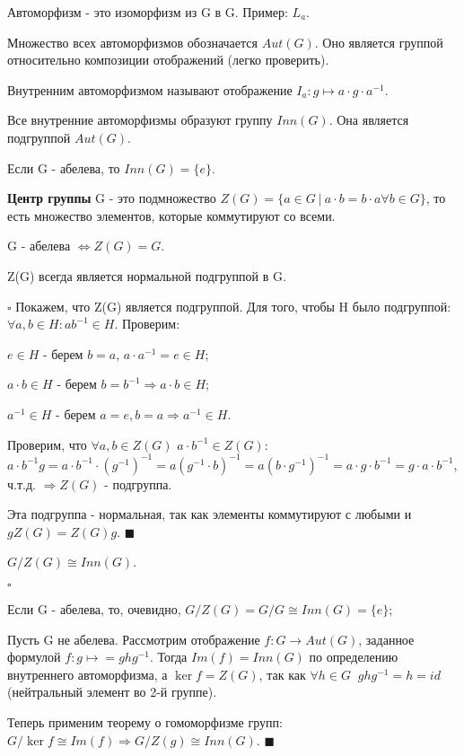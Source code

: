 \documentclass[../main.tex]{subfiles}
\begin{document}
\void{} Автоморфизм - это изоморфизм из G в G. Пример: $L_a$.

\void{} Множество всех автоморфизмов обозначается $Aut(G)$. 
Оно является группой относительно композиции отображений (легко проверить).

\void{} Внутренним автоморфизмом называют отображение $I_a: g\mapsto a\cdot g\cdot a^{-1}$.

\void{} Все внутренние автоморфизмы образуют группу
$Inn(G)$. Она является подгруппой $Aut(G)$.

\void{} Если G - абелева, то $Inn(G) = \{e\}$.

\void{} \textbf{Центр группы} G - это подмножество $Z(G) = \{a\in G\:\vert\: a\cdot b = b\cdot a \forall b\in G\}$, то
есть множество элементов, которые коммутируют со всеми.

\void{} G - абелева $\Longleftrightarrow Z(G) = G$.

\void{} Z(G) всегда является нормальной подгруппой в G.

\void
$\square$ Покажем, что Z(G) является подгруппой. Для того, чтобы H было подгруппой:
$\forall a,b\in H: ab^{-1}\in H$. Проверим:

\void{} $e\in H$ - берем $b = a$, $a\cdot a^{-1} = e\in H$;

 $a\cdot b\in H$ - берем $b = b^{-1} \Longrightarrow a\cdot b\in H$;

 $a^{-1}\in H$ - берем $a = e, b = a \Longrightarrow a^{-1}\in H$.

Проверим, что $\forall a, b\in Z(G)$ $a\cdot b^{-1}\in Z(G)$: $a\cdot b^{-1}g = a\cdot b^{-1}\cdot(g^{-1})^{-1} =
a(g^{-1}\cdot b)^{-1} = a(b\cdot g^{-1})^{-1} = a\cdot g\cdot b^{-1} = g\cdot a\cdot b^{-1}$, ч.т.д.
$\Longrightarrow Z(G)$ - подгруппа.

Эта подгруппа - нормальная, так как элементы коммутируют с любыми и $gZ(G) = Z(G)g$. $\blacksquare$

\void{} $G/Z(G) \cong Inn(G)$.

\void $\square$

 Если G - абелева, то, очевидно, $G/Z(G) = G/G\cong Inn(G) = \{e\}$;

 Пусть G не абелева. Рассмотрим отображение $f: G\rightarrow Aut(G)$,
заданное формулой $f: g\mapsto = ghg^{-1}$. Тогда $Im(f) = Inn(G)$ по определению внутреннего автоморфизма,
а $\ker f = Z(G)$, так как $\forall h\in G\;\; ghg^{-1} = h = id$ (нейтральный элемент во 2-й группе).

Теперь применим теорему о гомоморфизме групп: $G/\ker f\cong Im(f)\Longrightarrow G/Z(g)\cong Inn(G)$.
$\blacksquare$
\end{document}
